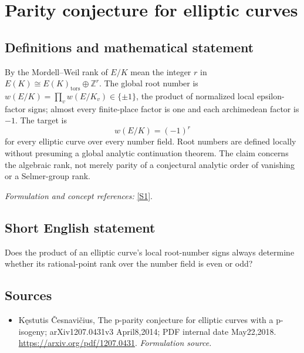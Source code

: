 \documentclass[11pt]{article}
\begin{document}
\section*{\texorpdfstring{Parity conjecture for elliptic curves}{Parity conjecture for elliptic curves}}\label{30006786}
\subsection{Definitions and mathematical statement}
By the Mordell--Weil rank of $E/K$ mean the integer $r$ in
$E(K)\cong E(K)_{\mathrm{tors}}\oplus{\mathbb{Z}}^r$. The global root number is
$w(E/K)=\prod_v w(E/K_v)\in\{\pm1\}$, the product of normalized local epsilon-factor signs; almost every finite-place factor is one and each archimedean factor is $-1$. The target is
\[
 w(E/K)=(-1)^r
\]
for every elliptic curve over every number field. Root numbers are defined locally without presuming a global analytic continuation theorem. The claim concerns the algebraic rank, not merely parity of a conjectural analytic order of vanishing or a Selmer-group rank.
\par\smallskip\textit{Formulation and concept references:} \href{https://arxiv.org/pdf/1207.0431}{[S1]}.

\subsection{Short English statement}
Does the product of an elliptic curve's local root-number signs always determine whether its rational-point rank over the number field is even or odd?
\subsection{Sources}
\begin{itemize}
\item[S1]Kęstutis Česnavičius, The p-parity conjecture for elliptic curves with a p-isogeny; arXiv1207.0431v3 April8,2014; PDF internal date May22,2018.
\url{https://arxiv.org/pdf/1207.0431}.
\textit{Formulation source.}
\end{itemize}
\end{document}

